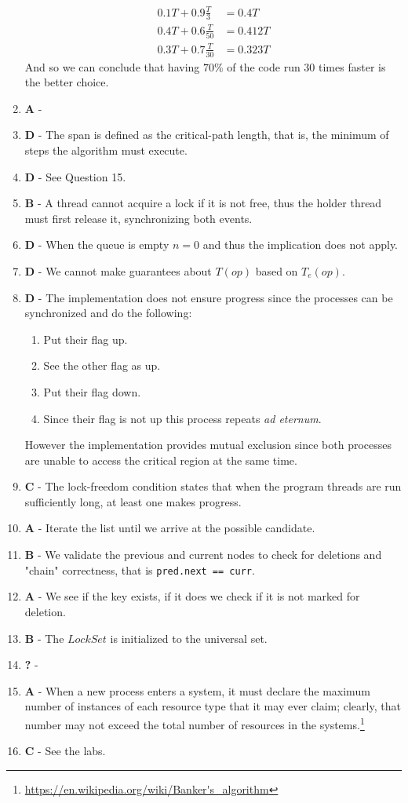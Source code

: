 \documentclass[a4paper,twocolumn]{article}
\begin{document}
\begin{enumerate}
\begin{equation*}
\begin{split}
            0.1 T + 0.9\frac{T}{3} & = 0.4T \\
            0.4 T + 0.6\frac{T}{50} & = 0.412T \\
            0.3 T + 0.7\frac{T}{30} & = 0.323T
        \end{split}
    \end{equation*}
    And so we can conclude that having $70\%$ of the code run 30 times faster is the better choice.
    \item \textbf{A} -
    \item \textbf{D} - The span is defined as the critical-path length, that is, the minimum of steps the algorithm must execute.
    \item \textbf{D} - See Question 15.
    \item \textbf{B} - A thread cannot acquire a lock if it is not free, thus the holder thread must first release it, synchronizing both events.
    \item \textbf{D} - When the queue is empty $n=0$ and thus the implication does not apply.
    \item \textbf{D} - We cannot make guarantees about $T(op)$ based on $T_e(op)$.
    \item \textbf{D} - The implementation does not ensure progress since the processes can be synchronized and do the following:
    \begin{enumerate}
        \item Put their flag up.
        \item See the other flag as up.
        \item Put their flag down.
        \item Since their flag is not up this process repeats \textit{ad eternum}.
    \end{enumerate}
    However the implementation provides mutual exclusion since both processes are unable to access the critical region at the same time.
    \item \textbf{C} - The lock-freedom condition states that when the program threads are run sufficiently long, at least one makes progress.
    \item \textbf{A} - Iterate the list until we arrive at the possible candidate.
    \item \textbf{B} - We validate the previous and current nodes to check for deletions and "chain" correctness, that is \texttt{pred.next == curr}.
    \item \textbf{A} - We see if the key exists, if it does we check if it is not marked for deletion.
    \item \textbf{B} - The $LockSet$ is initialized to the universal set.
    \item \textbf{?} -
    \item \textbf{A} - When a new process enters a system, it must declare the maximum number of instances of each resource type that it may ever claim;
    clearly, that number may not exceed the total number of resources in the systems.\footnote{\url{https://en.wikipedia.org/wiki/Banker's_algorithm}}
    \item \textbf{C} - See the labs.
\end{enumerate}
\end{document}
